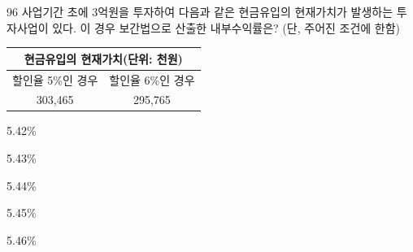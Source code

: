 \begin{question}{96}
사업기간 초에 3억원을 투자하여 다음과 같은 현금유입의 현재가치가 발생하는 투자사업이 있다. 이 경우 보간법으로 산출한 내부수익률은? (단, 주어진 조건에 한함)
\par{\small\centering
\begin{tabular}{|c|c|}\hline
\multicolumn{2}{|c|}{현금유입의 현재가치(단위: 천원)} \\ \hline
할인율 5\%인 경우 & 할인율 6\%인 경우 \\ \hline
303,465 & 295,765 \\ \hline
\end{tabular}\par}
\begin{choices}
  \item 5.42\%
  \item 5.43\%
  \item 5.44\%
  \item 5.45\%
  \item 5.46\%
\end{choices}
\end{question}

